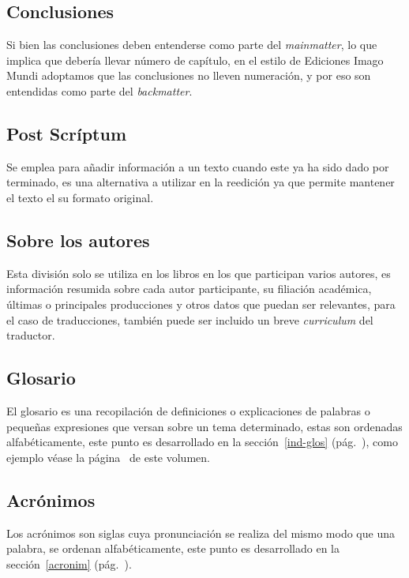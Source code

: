 \documentclass{book}
\begin{document}
{{{{{{{{{{{{{{{{{\subsection{Conclusiones}

Si bien las conclusiones deben entenderse como parte del  \emph{mainmatter}, lo que implica que debería llevar número de capítulo, en el estilo de Ediciones Imago Mundi adoptamos que las conclusiones no lleven numeración, y por eso son entendidas como parte del \emph{backmatter}.

\subsection{Post Scríptum}

Se emplea para añadir información a un texto cuando este ya ha sido dado por terminado, es una alternativa a utilizar en la reedición ya que permite mantener el texto el su formato original.

\subsection{Sobre los autores}

Esta división solo se utiliza en los libros en los que participan varios autores, es información resumida sobre cada autor participante, su filiación académica, últimas o principales producciones y otros datos que puedan ser relevantes, para el caso de traducciones, también puede ser incluido un breve \emph{curriculum} del traductor.

\subsection{Glosario}

El glosario es una recopilación de definiciones o explicaciones de palabras o pequeñas expresiones que versan sobre un tema determinado, estas son ordenadas alfabéticamente, este punto es desarrollado en la sección~\ref{ind-glos} (pág.~\pageref{ind-glos}), como ejemplo véase la página~\pageref{comienzo-glosario} de este volumen.

\subsection{Acrónimos}

Los acrónimos son siglas cuya pronunciación se realiza del mismo modo que una palabra, se ordenan alfabéticamente, este punto es desarrollado en la sección~\ref{acronim} (pág.~\pageref{acronim}).

}}}}}}}}}}}}}}}}}
\end{document}
